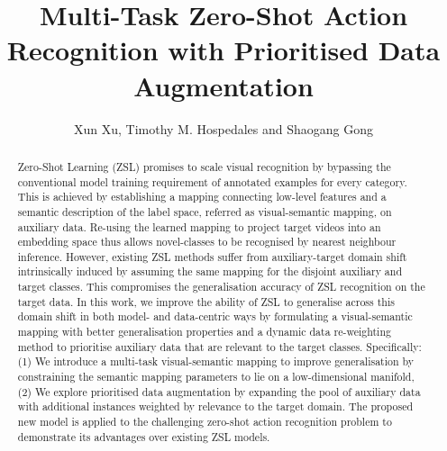 \documentclass[runningheads]{llncs}
\begin{document}
\pagestyle{headings}
\mainmatter

\title{Multi-Task Zero-Shot Action Recognition with Prioritised Data
  Augmentation} 



\author{Xun Xu, Timothy M. Hospedales and Shaogang Gong}





\maketitle

\begin{abstract}
Zero-Shot Learning (ZSL) promises to scale visual recognition by
bypassing the conventional model training requirement of annotated examples for every
category. This is achieved by establishing a
mapping connecting low-level features and a semantic description of
the label space, referred as visual-semantic mapping, on auxiliary data. Re-using the learned
mapping to project target videos into an embedding space thus allows novel-classes to be
recognised by nearest neighbour inference. However, existing ZSL
methods suffer from auxiliary-target domain shift intrinsically induced
by {assuming} the same mapping for the disjoint auxiliary and target
classes. This compromises 
the generalisation accuracy of ZSL recognition on the target data.  In this
work, we improve the ability of ZSL to generalise across this domain
shift in both model- and data-centric ways by formulating a visual-semantic mapping with better generalisation properties and a
dynamic data re-weighting method to prioritise auxiliary data that are
relevant to the target classes. Specifically: (1) We introduce a
multi-task visual-semantic mapping to improve generalisation
by constraining the semantic mapping
parameters to lie on a low-dimensional manifold, (2) We explore prioritised data 
augmentation by expanding the pool of auxiliary data with additional
 instances weighted by relevance to the target domain.
The proposed new model is applied to the challenging zero-shot action
recognition problem to demonstrate its advantages over existing ZSL models. 



\end{abstract}
\end{document}
